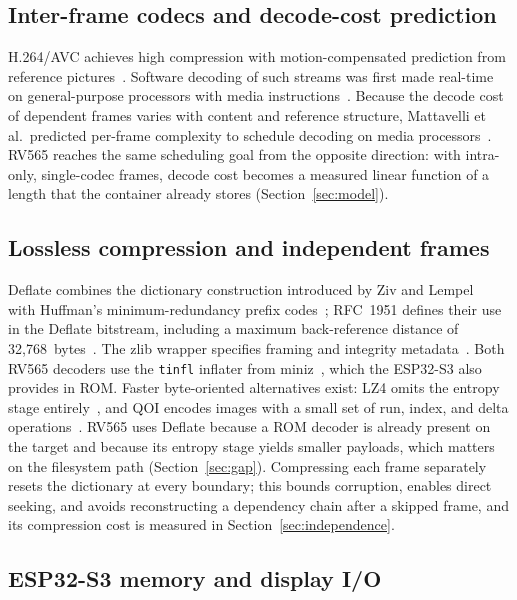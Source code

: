 \documentclass[11pt,twocolumn]{article}
\newcommand{\system}{RV565}
\begin{document}
\subsection{Inter-frame codecs and decode-cost prediction}

H.264/AVC achieves high compression with motion-compensated prediction from
reference pictures~\cite{wiegand2003overview}.  Software decoding of such
streams was first made real-time on general-purpose processors with media
instructions~\cite{lee1995realtime}.  Because the decode cost of dependent
frames varies with content and reference structure, Mattavelli et al.\
predicted per-frame complexity to schedule decoding on media
processors~\cite{mattavelli1998implementing}.  \system{} reaches the same
scheduling goal from the opposite direction: with intra-only, single-codec
frames, decode cost becomes a measured linear function of a length that the
container already stores (Section~\ref{sec:model}).

\subsection{Lossless compression and independent frames}

Deflate combines the dictionary construction introduced by Ziv and
Lempel~\cite{ziv1977universal} with Huffman's minimum-redundancy prefix
codes~\cite{huffman1952method}; RFC~1951 defines their use in the Deflate
bitstream, including a maximum back-reference distance of
32,768~bytes~\cite{deutsch1996deflate}.  The zlib wrapper specifies framing
and integrity metadata~\cite{deutsch1996zlib}.  Both \system{} decoders use
the \texttt{tinfl} inflater from miniz~\cite{miniz}, which the ESP32-S3 also
provides in ROM.  Faster byte-oriented alternatives exist: LZ4 omits the
entropy stage entirely~\cite{collet2024lz4}, and QOI encodes images with a
small set of run, index, and delta operations~\cite{szablewski2022qoi}.
\system{} uses Deflate because a ROM decoder is already present on the target
and because its entropy stage yields smaller payloads, which matters on the
filesystem path (Section~\ref{sec:gap}).  Compressing each frame separately
resets the dictionary at every boundary; this bounds corruption, enables
direct seeking, and avoids reconstructing a dependency chain after a skipped
frame, and its compression cost is measured in
Section~\ref{sec:independence}.

\subsection{ESP32-S3 memory and display I/O}
\end{document}
